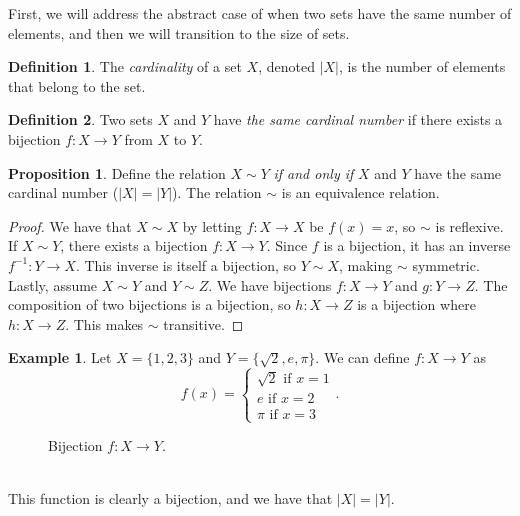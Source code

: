 \documentclass{article}
\theoremstyle{definition}
\newtheorem{proposition}{Proposition}[section]
\newtheorem{definition}{Definition}[section]
\newtheorem{example}{Example}[section]
\begin{document}
First, we will address the abstract case of when two sets have the same number of elements, and then we will transition to the size of sets.
\begin{definition}
	The \textit{\color{red}cardinality} of a set $ X $, denoted $ |X| $, is the number of elements that belong to the set.   
\end{definition} 
\begin{definition}
	Two sets $ X $ and $ Y $ have \textit{\color{red}the same cardinal number} if there exists a bijection $ f:X\to Y $ from $ X $ to $ Y $.  
\end{definition} 
\begin{proposition}
	Define the relation $ X\sim Y $ \textit{if and only if} $ X $ and $ Y $ have the same cardinal number ($ |X|=|Y| $). The relation $ \sim $ is an equivalence relation. 
\end{proposition} 
\begin{proof}
	We have that $ X\sim X $ by letting $ f:X\to X $ be $ f(x)=x $, so $ \sim $ is reflexive. If $ X\sim Y $, there exists a bijection $ f:X\to Y $. Since $ f $ is a bijection, it has an inverse $ f^{-1}:Y\to X $. This inverse is itself a bijection, so $ Y\sim X $, making $ \sim $ symmetric. Lastly, assume $ X\sim Y $ and $ Y\sim Z $. We have bijections $ f:X\to Y $ and $ g:Y\to Z $. The composition of two bijections is a bijection, so $ h:X\to Z $ is a bijection where $ h:X\to Z $. This makes $ \sim $ transitive.  
\end{proof}
\begin{example}
	Let $ X=\{1,2,3\} $ and $ Y=\{\sqrt{2},e,\pi\} $. We can define $ f:X\to Y $ as $$ f(x)=\begin{cases}
	\sqrt{2}\text{ if }x=1\\e\text{ if }x=2\\\pi\text{ if }x=3
	\end{cases}.$$
	\begin{figure}[h!]
		\centering
		\caption{Bijection $ f:X\to Y $.}
	\end{figure}  \\
This function is clearly a bijection, and we have that $ |X|=|Y| $.
\end{example} 
\end{document}
